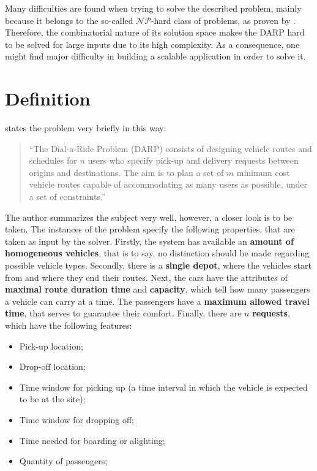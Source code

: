 \documentclass[tuberlin,cic,tc,openright,english,noabntcite,oneside]{iiufrgs}
\begin{document}
Many difficulties are found when trying to solve the described problem, mainly because it belongs to the so-called $\mathcal{NP}$-hard class of problems, as proven by \textcite{baugh_jr._intractability_1998}. Therefore, the combinatorial nature of its solution space makes the DARP hard to be solved for large inputs due to its high complexity. As a consequence, one might find major difficulty in building a scalable application in order to solve it.

\section{Definition}
\textcite[p. 29]{cordeau_dial--ride_2007} states the problem very briefly in this way:
\begin{quote}
\enquote{The Dial-a-Ride Problem (DARP) consists of designing vehicle routes and schedules for $n$ users who specify pick-up and delivery requests between origins and destinations. The aim is to plan a set of $m$ minimum cost vehicle routes capable of accommodating as many users as possible, under a set of constraints.}
\end{quote}

The author summarizes the subject very well, however, a closer look is to be taken. The instances of the problem specify the following properties, that are taken as input by the solver. Firstly, the system has available an \textbf{amount of homogeneous vehicles}, that is to say, no distinction should be made regarding possible vehicle types. Secondly, there is a \textbf{single depot}, where the vehicles start from and where they end their routes. Next, the cars have the attributes of \textbf{maximal route duration time} and \textbf{capacity}, which tell how many passengers a vehicle can carry at a time. The passengers have a \textbf{maximum allowed travel time}, that serves to guarantee their comfort. Finally, there are $n$ \textbf{requests}, which have the following features:

\begin{itemize}
\item Pick-up location;
\item Drop-off location;
\item Time window for picking up (a time interval in which the vehicle is expected to be at the site);
\item Time window for dropping off;
\item Time needed for boarding or alighting;
\item Quantity of passengers;
\end{itemize}
\end{document}
